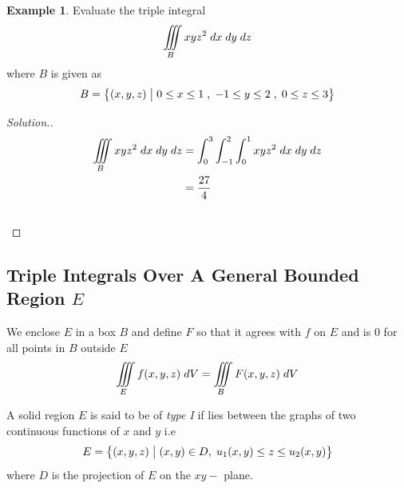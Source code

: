 \documentclass[11pt,a4paper]{article}
\theoremstyle{definition}
\newtheorem{exa}[thm]{Example}
\newenvironment{solution}
  {\renewcommand{\qedsymbol}{}\begin{proof}[\textit{Solution}.]}
  {\end{proof}}
\begin{document}
\begin{exa}


Evaluate the triple integral $$\iiint\limits_B xyz^2\hspace{0.1cm} dx\hspace{0.1cm} dy\hspace{0.1cm}dz $$ where $B$ is given as $$B = \big\{ (x,y,z)\hspace{0.1cm} \big|\hspace{0.1cm} 0\leq x\leq 1\hspace{0.1cm} , \hspace{0.1cm} -1 \leq y \leq 2 \hspace{0.1cm}, \hspace{0.1cm} 0\leq z\leq 3\big\}$$
\end{exa}


\begin{solution}
\begin{align*}
\iiint\limits_B xyz^2\hspace{0.1cm} dx\hspace{0.1cm} dy\hspace{0.1cm}dz & = \int^3_0 \int^2_{-1}\int^1_0 xyz^2\hspace{0.1cm} dx\hspace{0.1cm} dy\hspace{0.1cm}dz\\
& = \frac{27}{4}\\\\
\end{align*}
\end{solution}

{\color[wave]{485}\subsection{Triple Integrals Over A General Bounded Region $E$}}
We enclose $E$ in a box $B$ and define $F$ so that it agrees with $f$ on $E$ and is 0 for all points in $B$ outside $E$ $$\iiint\limits_E f(x,y,z)\hspace{0.1cm} dV = \iiint\limits_B F(x,y,z)\hspace{0.1cm}dV$$

A solid region $E$ is said to be of \textit{type I} if lies between the graphs of two continuous functions of $x$ and $y$ i.e $$E = \big\{ (x,y,z)\hspace{0.1cm}\big| \hspace{0.1cm} (x,y) \in D,\hspace{0.1cm} u_1(x,y) \leq z \leq u_2(x,y)\big\}$$ where $D$ is the projection of $E$ on the $xy-$ plane.
\end{document}
